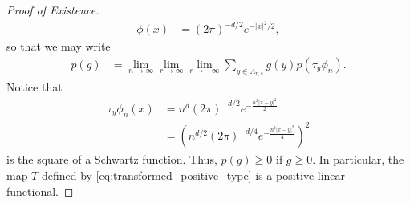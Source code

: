 \documentclass[10pt]{mypackage}
\begin{document}
\begin{proof}[Proof of Existence]
  \begin{align*}
    \phi(x) &= \left( 2\pi \right)^{-d/2} e^{-\left\vert x \right\vert^2/2},
  \end{align*}
  so that we may write
  \begin{align*}
    p(g) &= \lim_{n\to\infty}\lim_{r\to\infty}\lim_{r\to-\infty} \sum_{y\in \Lambda_{r,s}}g(y)p\left( \tau_y\phi_n \right).
  \end{align*}
  Notice that
  \begin{align*}
    \tau_y\phi_n(x) &= n^{d}\left( 2\pi \right)^{-d/2}e^{-\frac{n^2\left\vert x-y \right\vert^2}{2}}\\
                    &= \left( n^{d/2}\left( 2\pi \right)^{-d/4}e^{-\frac{n^2\left\vert x-y \right\vert^2}{4}} \right)^2
  \end{align*}
  is the square of a Schwartz function. Thus, $p(g) \geq 0$ if $g\geq 0$. In particular, the map $T$ defined by \eqref{eq:transformed_positive_type} is a positive linear functional.


\end{proof}
\end{document}

